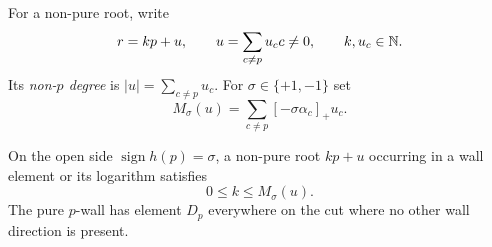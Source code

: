 For a non-pure root, write
\[
 r=kp+u,\qquad u=\sum_{c\ne p}u_cc\ne0,
 \qquad k,u_c\in\mathbb N.
\]
Its \emph{non-$p$ degree} is $|u|=\sum_{c\ne p}u_c$.  For
$\sigma\in\{+1,-1\}$ set
\begin{equation}
 M_\sigma(u)=\sum_{c\ne p}[-\sigma\alpha_c]_+u_c.
 \label{wall:fiber-bound-function}
\end{equation}

\begin{lemma}
\label{wall:fiber-bound}
On the open side $\operatorname{sign}h(p)=\sigma$, a non-pure
root $kp+u$ occurring in a wall element or its logarithm satisfies
\begin{equation}
 0\le k\le M_\sigma(u).
 \label{wall:fiber-bound-equation}
\end{equation}
The pure $p$-wall has element $D_p$ everywhere on the cut where
no other wall direction is present.
\end{lemma}

